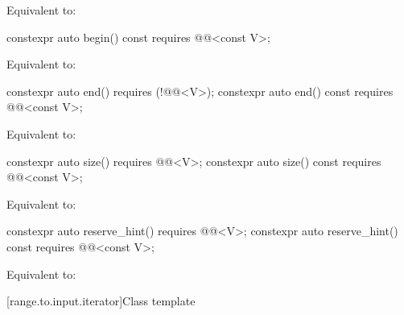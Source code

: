 \begin{itemdescr}
\pnum
\effects
Equivalent to: 
\end{itemdescr}

%
\begin{itemdecl}
constexpr auto begin() const requires @@<const V>;
\end{itemdecl}

\begin{itemdescr}
\pnum
\effects
Equivalent to: 
\end{itemdescr}

%
\begin{itemdecl}
constexpr auto end() requires (!@@<V>);
constexpr auto end() const requires @@<const V>;
\end{itemdecl}

\begin{itemdescr}
\pnum
\effects
Equivalent to: 
\end{itemdescr}

%
\begin{itemdecl}
constexpr auto size() requires @@<V>;
constexpr auto size() const requires @@<const V>;
\end{itemdecl}

\begin{itemdescr}
\pnum
\effects
Equivalent to: 
\end{itemdescr}

%
\begin{itemdecl}
constexpr auto reserve_hint() requires @@<V>;
constexpr auto reserve_hint() const requires @@<const V>;
\end{itemdecl}

\begin{itemdescr}
\pnum
\effects
Equivalent to: 
\end{itemdescr}

[range.to.input.iterator]{Class template }

